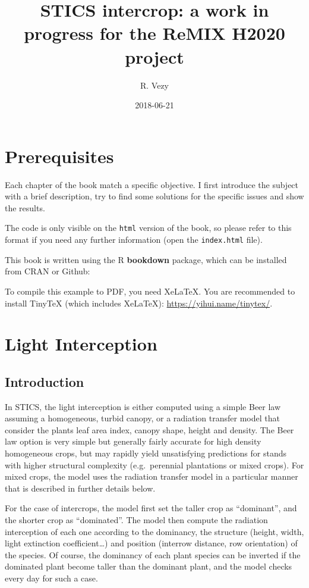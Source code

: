 \documentclass[]{book}
\title{STICS intercrop: a work in progress for the ReMIX H2020 project}
\author{R. Vezy}
\date{2018-06-21}
\theoremstyle{definition}
\theoremstyle{definition}
\theoremstyle{definition}
\theoremstyle{remark}
\begin{document}
\maketitle

{
\setcounter{tocdepth}{1}
\tableofcontents
}
\chapter{Prerequisites}\label{prerequisites}

Each chapter of the book match a specific objective. I first introduce
the subject with a brief description, try to find some solutions for the
specific issues and show the results.

The code is only visible on the \texttt{html} version of the book, so
please refer to this format if you need any further information (open
the \texttt{index.html} file).

This book is written using the R \textbf{bookdown} package, which can be
installed from CRAN or Github:

To compile this example to PDF, you need XeLaTeX. You are recommended to
install TinyTeX (which includes XeLaTeX):
\url{https://yihui.name/tinytex/}.

\chapter{Light Interception}\label{Light}

\section{Introduction}\label{introduction}

In STICS, the light interception is either computed using a simple Beer
law assuming a homogeneous, turbid canopy, or a radiation transfer model
that consider the plants leaf area index, canopy shape, height and
density. The Beer law option is very simple but generally fairly
accurate for high density homogeneous crops, but may rapidly yield
unsatisfying predictions for stands with higher structural complexity
(e.g.~perennial plantations or mixed crops). For mixed crops, the model
uses the radiation transfer model in a particular manner that is
described in further details below.

For the case of intercrops, the model first set the taller crop as
``dominant'', and the shorter crop as ``dominated''. The model then
compute the radiation interception of each one according to the
dominancy, the structure (height, width, light extinction
coefficient\ldots{}) and position (interrow distance, row orientation)
of the species. Of course, the dominancy of each plant species can be
inverted if the dominated plant become taller than the dominant plant,
and the model checks every day for such a case.
\end{document}
